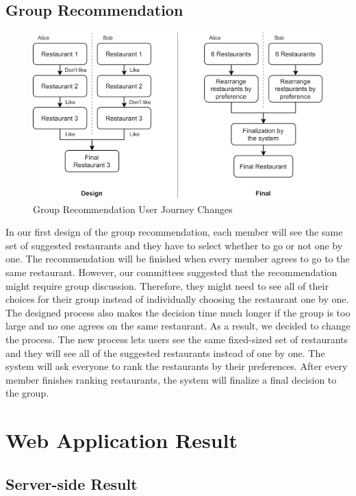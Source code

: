 \documentclass[12pt,oneside,openright,a4paper]{cpe-english-project}
\begin{document}
\subsection{Group Recommendation}

\begin{figure}[H]\centering
\includegraphics[width=350pt]{./images/4GroupRecommendationUserJourneyChanges.png}
\caption{Group Recommendation User Journey Changes}\label{fig:4GroupRecommendationUserJourneyChanges}
\end{figure}

In our first design of the group recommendation, each member will see the same set of suggested restaurants and they have to select whether to go or not one by one. The recommendation will be finished when every member agrees to go to the same restaurant. However, our committees suggested that the recommendation might require group discussion. Therefore, they might need to see all of their choices for their group instead of individually choosing the restaurant one by one. The designed process also makes the decision time much longer if the group is too large and no one agrees on the same restaurant. As a result, we decided to change the process. The new process lets users see the same fixed-sized set of restaurants and they will see all of the suggested restaurants instead of one by one. The system will ask everyone to rank the restaurants by their preferences. After every member finishes ranking restaurants, the system will finalize a final decision to the group.


\section{Web Application Result}

\subsection{Server-side Result}
\end{document}
